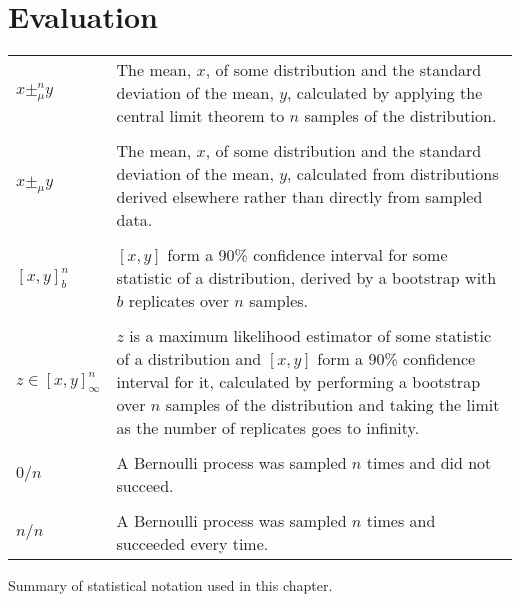 \newcommand{\biggraph}[1]{}

\chapter{Evaluation}
\label{chapter:eval}

\begin{sanefig}
  \begin{tabular}{lp{12.7cm}}
    $x \pm^n_\mu y$ & The mean, $x$, of some distribution and the standard deviation of the mean, $y$, calculated by applying the central limit theorem to $n$ samples of the distribution.\\
    & \\
    $x \pm_\mu y$ & The mean, $x$, of some distribution and the standard deviation of the mean, $y$, calculated from distributions derived elsewhere rather than directly from sampled data.\\
    & \\
    $[x,y]^n_b$ & $[x,y]$ form a 90\% confidence interval for some statistic of a distribution, derived by a bootstrap with $b$ replicates over $n$ samples. \\
    & \\
    $z \in [x,y]^n_\infty$ & $z$ is a maximum likelihood estimator of some statistic of a distribution and $[x,y]$ form a 90\% confidence interval for it, calculated by performing a bootstrap over $n$ samples of the distribution and taking the limit as the number of replicates goes to infinity.\\
    & \\
    $0/n$ & A Bernoulli process was sampled $n$ times and did not succeed. \\
    &\\
    $n/n$ & A Bernoulli process was sampled $n$ times and succeeded every time. \\
  \end{tabular}
  \caption{Summary of statistical notation used in this chapter.}
\end{sanefig}

